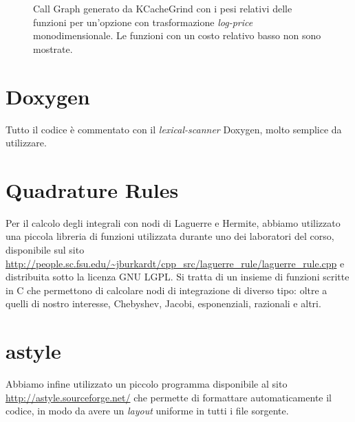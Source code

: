 \documentclass[a4paper,10pt]{report}
\theoremstyle{plain}
\theoremstyle{definition}
\theoremstyle{remark}
\begin{document}
\begin{figure}[!htb]
 \caption{Call Graph generato da \textsf{KCacheGrind} con i pesi relativi delle funzioni per un'opzione con trasformazione \emph{log-price} monodimensionale. Le funzioni con un costo relativo basso non sono mostrate.}
\label{fig:callgraph}
 \end{figure}
\section{\textsf{Doxygen}}
Tutto il codice \`e commentato con il \emph{lexical-scanner} \textsf{Doxygen}, molto semplice da utilizzare. 
\section{Quadrature Rules}
Per il calcolo degli integrali con nodi di Laguerre e Hermite, abbiamo utilizzato una piccola libreria di funzioni utilizzata durante uno dei laboratori del corso, disponibile sul sito \url{http://people.sc.fsu.edu/~jburkardt/cpp_src/laguerre_rule/laguerre_rule.cpp} e distribuita sotto la licenza GNU LGPL. Si tratta di un insieme di funzioni scritte in C che permettono di calcolare nodi di integrazione di diverso tipo: oltre a quelli di nostro interesse, Chebyshev, Jacobi, esponenziali, razionali e altri.
\section{\textsf{astyle}}
Abbiamo infine utilizzato un piccolo programma disponibile al sito \url{http://astyle.sourceforge.net/} che permette di formattare automaticamente il codice, in modo da avere un \emph{layout} uniforme in tutti i file sorgente.
\end{document}
